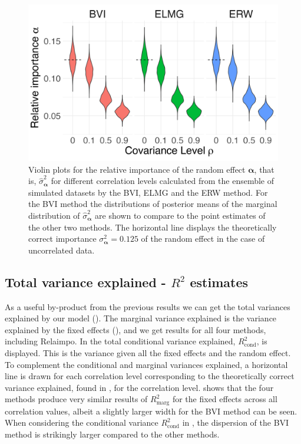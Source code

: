 \begin{figure}[ht]
  \centering
  \includegraphics[width=0.7\linewidth]{Figures/ViolinPlots/Variance_gamma.png}
  \caption{Violin plots for the relative importance of the random effect $\boldsymbol{\alpha}$, that is, $\hat{\sigma}^2_{\boldsymbol{\alpha}}$ for different correlation levels calculated from the ensemble of simulated datasets by the BVI, ELMG and the ERW method. For the BVI method the distributions of posterior means of the marginal distribution of $\hat{\sigma}^2_{\boldsymbol{\alpha}}$ are shown to compare to the point estimates of the other two methods. The horizontal line displays the theoretically correct importance $\sigma^2_{\boldsymbol{\alpha}} = 0.125$ of the random effect in the case of uncorrelated data.}
  \label{fig:relimp_alpha}
\end{figure}

\subsection{Total variance explained - $R^2$ estimates}
\label{sec:R2} 
As a useful by-product from the previous results we can get the total variances explained by our model ().
The marginal variance explained is the variance explained by the fixed effects (), and we get results for all four methods, including Relaimpo.
In  the total conditional variance explained, $R^2_{\text{cond}}$, is displayed. 
This is the variance given all the fixed effects and the random effect.
To complement the conditional and marginal variances explained, a horizontal line is drawn for each correlation level corresponding to the theoretically correct variance explained, found in , for the correlation level. 
\newline
\newline
{} shows that the four methods produce very similar results of $R^2_{\text{marg}}$ for the fixed effects across all correlation values, albeit a slightly larger width for the BVI method can be seen.
When considering the conditional variance $R^2_{\text{cond}}$ in , the dispersion of the BVI method is strikingly larger compared to the other methods. 


